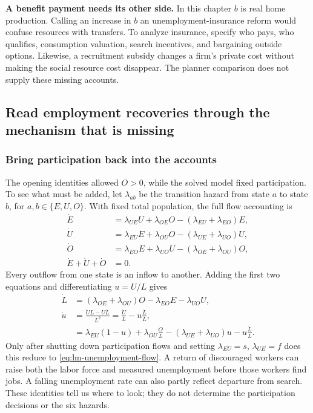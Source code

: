 \begin{redblock}
\textbf{A benefit payment needs its other side.}
In this chapter $b$ is real home production. Calling an increase in $b$ an
unemployment-insurance reform would confuse resources with transfers. To
analyze insurance, specify who pays, who qualifies, consumption valuation,
search incentives, and bargaining outside options. Likewise, a recruitment
subsidy changes a firm's private cost without making the social resource
cost disappear. The planner comparison does not supply these missing accounts.
\end{redblock}

\subsection{Read employment recoveries through the mechanism that is missing}

\subsubsection{Bring participation back into the accounts}

The opening identities allowed $O>0$, while the solved model fixed
participation. To see what must be added, let $\lambda_{ab}$ be the transition
hazard from state $a$ to state $b$, for $a,b\in\{E,U,O\}$. With fixed total
population, the full flow accounting is
\begin{align}
 \dot E&=\lambda_{UE}U+\lambda_{OE}O
                   -(\lambda_{EU}+\lambda_{EO})E,\\
 \dot U&=\lambda_{EU}E+\lambda_{OU}O
                   -(\lambda_{UE}+\lambda_{UO})U,\\
 \dot O&=\lambda_{EO}E+\lambda_{UO}U
                   -(\lambda_{OE}+\lambda_{OU})O,\\
 \dot E+\dot U+\dot O&=0.
\end{align}
Every outflow from one state is an inflow to another. Adding the first two
equations and differentiating $u=U/L$ gives
\begin{align}
 \dot L&=(\lambda_{OE}+\lambda_{OU})O
                   -\lambda_{EO}E-\lambda_{UO}U,\\
 \dot u&=\frac{\dot U L-U\dot L}{L^2}
        =\frac{\dot U}{L}-u\frac{\dot L}{L},\\
 &=\lambda_{EU}(1-u)+\lambda_{OU}\frac OL
   -(\lambda_{UE}+\lambda_{UO})u-u\frac{\dot L}{L}.
\end{align}
Only after shutting down participation flows and setting
$\lambda_{EU}=s$, $\lambda_{UE}=f$ does this reduce to
\eqref{eq:lm-unemployment-flow}. A return of discouraged workers can raise
both the labor force and measured unemployment before those workers find
jobs. A falling unemployment rate can also partly reflect departure from
search. These identities tell us where to look; they do not determine the
participation decisions or the six hazards.


